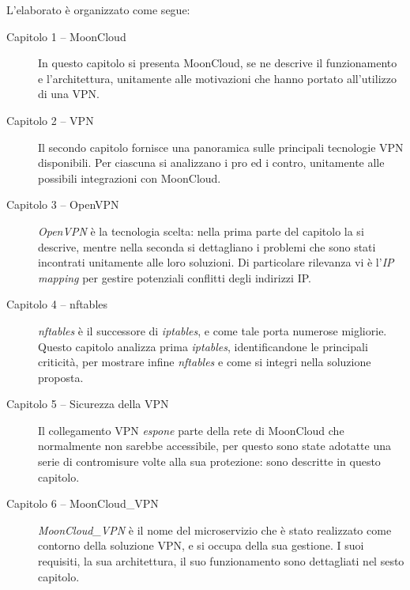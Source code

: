 L'elaborato è organizzato come segue:
\begin{description}
    \item[Capitolo 1 -- MoonCloud] In questo capitolo si presenta MoonCloud, se ne
    descrive il funzionamento e l'architettura, unitamente
    alle motivazioni che hanno portato all'utilizzo di una VPN.
    \item[Capitolo 2 -- VPN] Il secondo capitolo fornisce una panoramica sulle
    principali tecnologie VPN disponibili. Per ciascuna si analizzano
    i pro ed i contro, unitamente alle possibili integrazioni con MoonCloud.
    \item[Capitolo 3 -- OpenVPN] \textit{OpenVPN} è la tecnologia scelta: nella
    prima parte del capitolo la si descrive, mentre nella seconda si dettagliano
    i problemi che sono stati incontrati unitamente alle loro soluzioni.
    Di particolare rilevanza vi è l'\textit{IP mapping} per gestire potenziali conflitti degli
    indirizzi IP.
    \item[Capitolo 4 -- nftables] \textit{nftables} è il successore di \textit{iptables},
    e come tale porta numerose migliorie. Questo capitolo analizza
    prima \textit{iptables}, identificandone le principali criticità, per mostrare
    infine \textit{nftables} e come si integri nella soluzione proposta.
    \item[Capitolo 5 -- Sicurezza della VPN] Il collegamento VPN \textit{espone}
    parte della rete di MoonCloud che normalmente non sarebbe accessibile, per questo
    sono state adotatte una serie di contromisure volte alla sua protezione: sono descritte
    in questo capitolo.
    \item[Capitolo 6 -- MoonCloud\_VPN] \textit{MoonCloud\_VPN} è il nome del
    microservizio che è stato realizzato come contorno della soluzione VPN, e si
    occupa della sua gestione. I suoi requisiti, la sua architettura, il suo
    funzionamento sono dettagliati nel sesto capitolo.
\end{description}